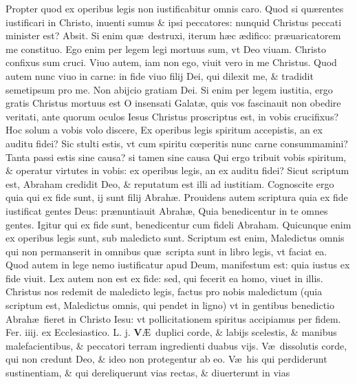 \documentclass[a5paper,10pt]{book}
\def\leftmarginnote{%
	\lrmarginnote{\hskip -\marginparsep \hskip -6.5em}}
\def\rightmarginnote{%
	\lrmarginnote{\hskip\columnwidth \hskip -1em}}
\def\ae{æ}
\def\AE{Æ}
\def\oe{œ}
\begin{document}
\begin{multicols*}{2}
Propter quod ex operibus legis non
iustificabitur omnis caro.
Quod si qu\ae rentes iustificari in Christo, inuenti sumus \& ipsi peccatores: nunquid Christus peccati minister est? Absit.
Si enim qu\ae \ destruxi, iterum h\ae c \ae difico: pr\ae uaricatorem me constituo. Ego enim per legem legi mortuus sum, vt Deo viuam. Christo confixus sum cruci.
Viuo autem, iam non ego, viuit vero in me Christus. Quod autem nunc viuo in carne: in fide viuo filij Dei, qui dilexit me, \& tradidit semetipsum pro me.
Non abijcio gratiam Dei. Si enim per legem iustitia, ergo gratis Christus mortuus est
O\leftmarginnote{\begin{flushright}ca. 3.\end{flushright}} insensati Galat\ae , quis vos fascinauit non obedire veritati, ante quorum oculos Iesus Christus proscriptus est, in vobis crucifixus?
Hoc solum a vobis volo discere, Ex operibus legis spiritum accepistis, an ex auditu fidei? Sic stulti estis, vt cum spiritu c\oe peritis nunc carne consummamini?
Tanta passi estis sine causa? si tamen sine causa Qui ergo tribuit vobis spiritum, \& operatur virtutes in vobis: ex operibus legis, an ex auditu fidei?
Sicut scriptum est, Abraham credidit Deo, \& reputatum est illi ad iustitiam. Cognoscite ergo quia qui ex fide sunt, ij sunt filij Abrah\ae .
Prouidens autem scriptura quia ex fide iustificat gentes Deus: pr\ae nuntiauit Abrah\ae , Quia benedicentur in te omnes gentes.
Igitur qui ex fide sunt, benedicentur cum fideli Abraham. Quicunque enim ex operibus legis sunt, sub maledicto sunt.
Scriptum est enim, Maledictus omnis qui non permanserit in omnibus qu\ae \ scripta sunt in libro legis, vt faciat ea.
Quod autem in lege nemo iustificatur apud Deum, manifestum est: quia iustus ex fide viuit. Lex autem non est ex fide: sed, qui fecerit ea homo, viuet in illis.
Christus nos redemit de maledicto legis, factus pro nobis maledictum (quia scriptum est, Maledictus omnis, qui pendet in ligno) vt in gentibus benedictio Abrah\ae \ fieret in Christo Iesu: vt pollicitationem spiritus accipiamus per fidem.
\newline {} \color{red} \hypertarget{WED-PRIMA-VAGAN}{Fer. iiij.} ex Ecclesiastico. L. j. \color{black}
\vspace{-.25em}
\lettrine[lines=2]{\bfseries V}{}\AE \ duplici\rightmarginnote{ca. 2.} corde, \& labijs scelestis, \& manibus malefacientibus, \& peccatori terram ingredienti duabus vijs. V\ae \ dissolutis corde, qui non credunt Deo, \& ideo non protegentur ab eo.
V\ae \ his qui perdiderunt sustinentiam, \& qui dereliquerunt vias rectas, \& diuerterunt in vias

\end{multicols*}
\end{document}
